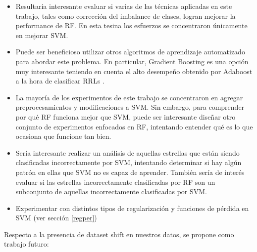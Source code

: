 \begin{itemize}
\item Resultaría interesante evaluar si varias de las técnicas aplicadas en este trabajo, tales como corrección del imbalance de clases, logran mejorar la performance de RF. En esta tesina los esfuerzos se concentraron únicamente en mejorar SVM.
\item Puede ser beneficioso utilizar otros algoritmos de aprendizaje automatizado para abordar este problema. En particular, Gradient Boosting \cite{friedman2000greedy} \cite{friedman2} es una opción muy interesante teniendo en cuenta el alto desempeño obtenido por Adaboost a la hora de clasificar RRLs \cite{elorrieta}.
\item La mayoría de los experimentos de este trabajo se concentraron en agregar preprocesamientos y modificaciones a SVM. Sin embargo, para comprender por qué RF funciona mejor que SVM, puede ser interesante diseñar otro conjunto de experimentos enfocados en RF, intentando entender qué es lo que ocasiona que funcione tan bien.
\item Sería interesante realizar un análisis de aquellas estrellas que están siendo clasificadas incorrectamente por SVM, intentando determinar si hay algún patrón en ellas que SVM no es capaz de aprender. También sería de interés evaluar si las estrellas incorrectamente clasificadas por RF son un subconjunto de aquellas incorrectamente clasificadas por SVM.
\item Experimentar con distintos tipos de regularización y funciones de pérdida en SVM (ver sección \ref{regper})
\end{itemize}

Respecto a la presencia de dataset shift en nuestros datos, se propone como trabajo futuro:

